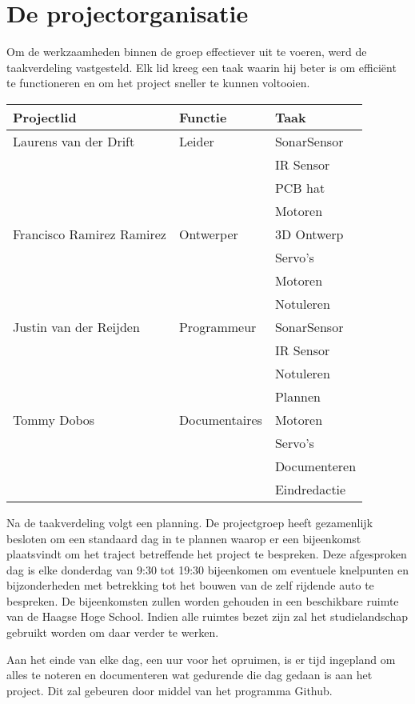 \section{De projectorganisatie}
Om de werkzaamheden binnen de groep effectiever uit te voeren, werd de taakverdeling vastgesteld. Elk lid kreeg een taak waarin hij beter is om efficiënt te functioneren en om het project sneller te kunnen voltooien.


\begin{table}[h]
\begin{tabular}{|l|l|l|}
\hline
\rowcolor[HTML]{9B9B9B} 
{\color[HTML]{FFFFFF} \textbf{Projectlid}} & {\color[HTML]{FFFFFF} \textbf{Functie}} & {\color[HTML]{FFFFFF} \textbf{Taak}} \\ \hline
\rowcolor[HTML]{EFEFEF} 
Laurens van der Drift & Leider & SonarSensor \\ \hline
 &  & IR Sensor \\ \hline
 &  & \cellcolor[HTML]{EFEFEF}PCB hat \\ \hline
 &  & Motoren \\ \hline
\rowcolor[HTML]{EFEFEF} 
Francisco Ramirez Ramirez & Ontwerper & 3D   Ontwerp \\ \hline
 &  & Servo's \\ \hline
 &  & \cellcolor[HTML]{EFEFEF}Motoren \\ \hline
 &  & Notuleren \\ \hline
\rowcolor[HTML]{EFEFEF} 
Justin   van der Reijden & Programmeur & SonarSensor \\ \hline
 &  & IR Sensor \\ \hline
 &  & \cellcolor[HTML]{EFEFEF}Notuleren \\ \hline
 &  & Plannen \\ \hline
\rowcolor[HTML]{EFEFEF} 
Tommy Dobos & Documentaires & Motoren \\ \hline
 &  & Servo's \\ \hline
 &  & \cellcolor[HTML]{EFEFEF}Documenteren \\ \hline
 &  & Eindredactie \\ \hline
\end{tabular}
\end{table}

Na de taakverdeling volgt een planning. De projectgroep heeft gezamenlijk besloten om een standaard dag in te plannen waarop er een bijeenkomst plaatsvindt om het traject betreffende het project te bespreken. Deze afgesproken dag is elke donderdag van 9:30 tot 19:30 bijeenkomen om eventuele knelpunten en bijzonderheden met betrekking tot het bouwen van de zelf rijdende auto te bespreken. De bijeenkomsten zullen worden gehouden in een beschikbare ruimte van de Haagse Hoge School.  Indien alle ruimtes bezet zijn zal  het studielandschap gebruikt worden om daar verder te werken.

Aan het einde van elke dag, een uur voor het opruimen, is er tijd ingepland om alles te noteren en documenteren wat gedurende die dag gedaan is aan het project. Dit zal gebeuren door middel van het programma Github.  